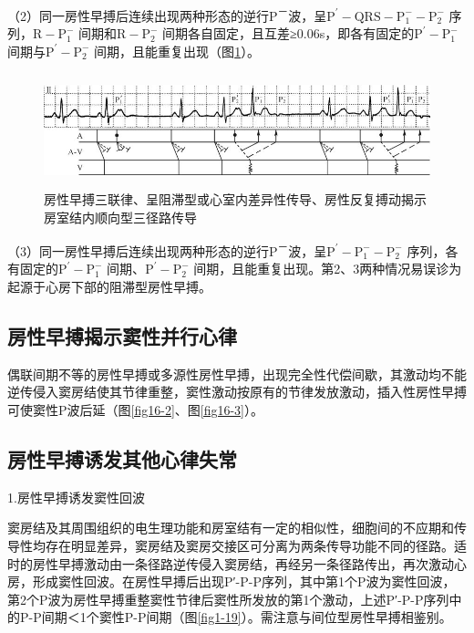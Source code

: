 （2）同一房性早搏后连续出现两种形态的逆行P\textsuperscript{－}波，呈$\text{P}^\prime-\text{QRS}-\text{P}_1^--\text{P}_2^-$
序列，$\text{R}-\text{P}_1^-$
间期和$\text{R}-\text{P}_2^-$
间期各自固定，且互差≥0.06s，即各有固定的$\text{P}^\prime-\text{P}_1^-$
间期与$\text{P}^\prime-\text{P}_2^-$
间期，且能重复出现（图\ref{fig11-12}）。

\begin{figure}[!htbp]
 \centering
 \includegraphics[width=5.58333in,height=1.29167in]{./images/Image00169.jpg}
 \captionsetup{justification=centering}
 \caption{房性早搏三联律、呈阻滞型或心室内差异性传导、房性反复搏动揭示房室结内顺向型三径路传导}
 \label{fig11-12}
  \end{figure} 

（3）同一房性早搏后连续出现两种形态的逆行P\textsuperscript{－}波，呈$\text{P}^\prime-\text{P}_1^--\text{P}_2^-$
序列，各有固定的$\text{P}^\prime-\text{P}_1^-$
间期、$\text{P}^\prime-\text{P}_2^-$
间期，且能重复出现。第2、3两种情况易误诊为起源于心房下部的阻滞型房性早搏。

\protect\hypertarget{text00018.htmlux5cux23subid140}{}{}

\subsection{房性早搏揭示窦性并行心律}

偶联间期不等的房性早搏或多源性房性早搏，出现完全性代偿间歇，其激动均不能逆传侵入窦房结使其节律重整，窦性激动按原有的节律发放激动，插入性房性早搏可使窦性P波后延（图\ref{fig16-2}、图\ref{fig16-3}）。

\protect\hypertarget{text00018.htmlux5cux23subid141}{}{}

\subsection{房性早搏诱发其他心律失常}

1.房性早搏诱发窦性回波

窦房结及其周围组织的电生理功能和房室结有一定的相似性，细胞间的不应期和传导性均存在明显差异，窦房结及窦房交接区可分离为两条传导功能不同的径路。适时的房性早搏激动由一条径路逆传侵入窦房结，再经另一条径路传出，再次激动心房，形成窦性回波。在房性早搏后出现P′-P-P序列，其中第1个P波为窦性回波，第2个P波为房性早搏重整窦性节律后窦性所发放的第1个激动，上述P′-P-P序列中的P-P间期＜1个窦性P-P间期（图\ref{fig1-19}）。需注意与间位型房性早搏相鉴别。

